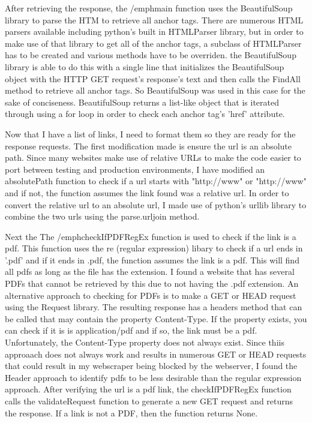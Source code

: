 \documentclass[12pt]{article}
\begin{document}
After retrieving the response, the /emph{main} function uses the BeautifulSoup library to parse the HTM to retrieve all anchor tags. There are numerous HTML parsers available including python's built in HTMLParser library, but in order to make use
of that library to get all of the anchor tags, a subclass of HTMLParser has to be created and various methods have to be overriden. the BeautifulSoup library is able to do this with a single line that initializes the BeautifulSoup  object with
the HTTP GET request's response's text and then calls the FindAll method to retrieve all anchor tags. So BeautifulSoup was used in this case for the sake of conciseness.  BeautifulSoup returns a list-like object that is iterated through using a for loop in order to check each anchor tag's 'href' attribute. 

Now that I have a list of links, I need to format them so they are ready for the response requests. The first modification made is ensure the url is an absolute path. Since many websites make use of  relative URLs to make the code easier to port between testing and production environments, I have modified an absolutePath function \cite{stackOverflowRelativePath} to check if a url starts with "http://www" or "http://www" and if not, the function assumes the link found was a relative url. In order to convert the relative url to an absolute url, I made use of python's urllib library to combine the two urls using the parse.urljoin method. 

Next the The /emph{checkIfPDFRegEx} function is used to check if the link is a pdf. This function uses the re (regular expression) libary to check if a url ends in '.pdf' and if it ends in .pdf, the function assumes the link is a pdf. This will find all pdfs as long as the file has the extension. I found a website \cite{anthropologicalScienceWebsite} that has several PDFs that cannot be retrieved by this due to not having the .pdf extension. An alternative approach to checking for PDFs is to make a GET or HEAD request using the Request library. The resulting response has a headers method that can be called that may contain the property Content-Type. If the property exists, you can check if it is is application/pdf and if so, the link must be a pdf. Unfortunately, the Content-Type property does not always exist. Since thiis approaach does not always work and results in numerous GET or HEAD requests that could result in my webscraper being blocked by the webserver,  I found the Header approach to identify pdfs to be less desirable than the regular expression approach. After verifying the url is a pdf link, the checkIfPDFRegEx function calls the validateRequest function to generate a new GET request and returns the response. If a link is not a PDF, then the function returns None.
\end{document}
